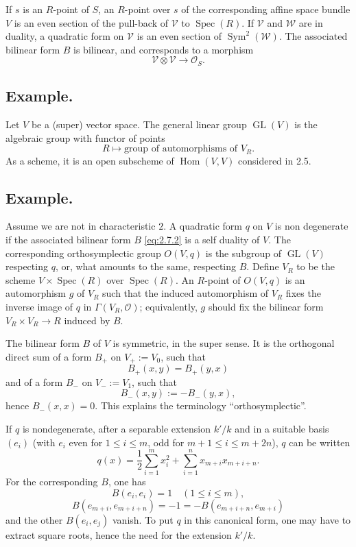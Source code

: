 \documentclass[11pt,a4paper]{article}
\theoremstyle{plain}
\theoremstyle{definition}
\DeclareMathOperator{\Hom}{Hom}
\DeclareMathOperator{\Spec}{Spec}
\DeclareMathOperator{\GL}{GL}
\DeclareMathOperator{\Sym}{Sym}
\begin{document}
If $s$ is an $R$-point of $S$, an $R$-point over $s$ of the corresponding affine space bundle $V$ is an even section of the pull-back of $\mathcal{V}$ to $\Spec(R)$. If $\mathcal{V}$ and $\mathcal{W}$ are in duality, a quadratic form on $\mathcal{V}$ is an even section of $\Sym^2(\mathcal{W})$. The associated bilinear form $B$ is bilinear, and corresponds to a morphism
\[
\mathcal{V} \otimes \mathcal{V} \to \mathcal{O}_S.
\]

\subsection{Example.}
Let $V$ be a (super) vector space. The general linear group $\GL(V)$ is the algebraic group with functor of points
\[
R \mapsto \text{group of automorphisms of } V_R.
\]
As a scheme, it is an open subscheme of $\Hom(V,V)$ considered in 2.5.

\subsection{Example.}
Assume we are not in characteristic $2$. A quadratic form $q$ on $V$ is non degenerate if the associated bilinear form $B$ \eqref{eq:2.7.2} is a self duality of $V$. The corresponding orthosymplectic group $O(V,q)$ is the subgroup of $\GL(V)$ respecting $q$, or, what amounts to the same, respecting $B$. Define $V_R$ to be the scheme $V \times \Spec(R)$ over $\Spec(R)$. An $R$-point of $O(V,q)$ is an automorphism $g$ of $V_R$ such that the induced automorphism of $V_R$ fixes the inverse image of $q$ in $\Gamma(V_R, \mathcal{O})$; equivalently, $g$ should fix the bilinear form $V_R \times V_R \to R$ induced by $B$.

The bilinear form $B$ of $V$ is symmetric, in the super sense. It is the orthogonal direct sum of a form $B_+$ on $V_+ := V_0$, such that
\[
B_+(x,y) = B_+(y,x)
\]
and of a form $B_-$ on $V_- := V_1$, such that
\[
B_-(x,y) := -B_-(y,x),
\]
hence $B_-(x,x) = 0$. This explains the terminology ``orthosymplectic''.

If $q$ is nondegenerate, after a separable extension $k'/k$ and in a suitable basis $(e_i)$ (with $e_i$ even for $1 \leq i \leq m$, odd for $m+1 \leq i \leq m+2n$), $q$ can be written
\begin{equation}\label{eq:2.11.1}
q(x) = \frac{1}{2} \sum_{i=1}^{m} x_i^2 + \sum_{i=1}^{n} x_{m+i} x_{m+i+n}.
\end{equation}
For the corresponding $B$, one has
\begin{equation}\label{eq:2.11.2}
B(e_i, e_i) = 1 \quad (1 \leq i \leq m),
\end{equation}
\[
B(e_{m+i}, e_{m+i+n}) = -1 = -B(e_{m+i+n}, e_{m+i})
\]
and the other $B(e_i, e_j)$ vanish. To put $q$ in this canonical form, one may have to extract square roots, hence the need for the extension $k'/k$.
\end{document}
